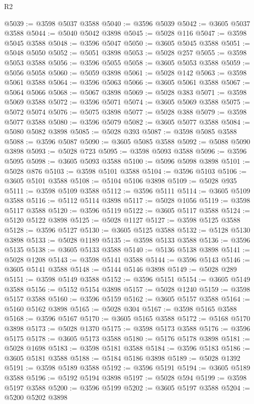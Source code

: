 \begin{lexlean}{R2}
\begin{coremodule}
@5039 := @3598 @5037 @3588
@5040 := @3596 @5039
@5042 := @3605 @5037 @3588
@5044 := @5040 @5042 @3898
@5045 := @5028 @116
@5047 := @3598 @5045 @3588
@5048 := @3596 @5047
@5050 := @3605 @5045 @3588
@5051 := @5048 @5050
@5052 := @5051 @3898
@5053 := @5028 @257
@5055 := @3598 @5053 @3588
@5056 := @3596 @5055
@5058 := @3605 @5053 @3588
@5059 := @5056 @5058
@5060 := @5059 @3898
@5061 := @5028 @142
@5063 := @3598 @5061 @3588
@5064 := @3596 @5063
@5066 := @3605 @5061 @3588
@5067 := @5064 @5066
@5068 := @5067 @3898
@5069 := @5028 @383
@5071 := @3598 @5069 @3588
@5072 := @3596 @5071
@5074 := @3605 @5069 @3588
@5075 := @5072 @5074
@5076 := @5075 @3898
@5077 := @5028 @388
@5079 := @3598 @5077 @3588
@5080 := @3596 @5079
@5082 := @3605 @5077 @3588
@5084 := @5080 @5082 @3898
@5085 := @5028 @393
@5087 := @3598 @5085 @3588
@5088 := @3596 @5087
@5090 := @3605 @5085 @3588
@5092 := @5088 @5090 @3898
@5093 := @5028 @723
@5095 := @3598 @5093 @3588
@5096 := @3596 @5095
@5098 := @3605 @5093 @3588
@5100 := @5096 @5098 @3898
@5101 := @5028 @876
@5103 := @3598 @5101 @3588
@5104 := @3596 @5103
@5106 := @3605 @5101 @3588
@5108 := @5104 @5106 @3898
@5109 := @5028 @935
@5111 := @3598 @5109 @3588
@5112 := @3596 @5111
@5114 := @3605 @5109 @3588
@5116 := @5112 @5114 @3898
@5117 := @5028 @1056
@5119 := @3598 @5117 @3588
@5120 := @3596 @5119
@5122 := @3605 @5117 @3588
@5124 := @5120 @5122 @3898
@5125 := @5028 @1127
@5127 := @3598 @5125 @3588
@5128 := @3596 @5127
@5130 := @3605 @5125 @3588
@5132 := @5128 @5130 @3898
@5133 := @5028 @1189
@5135 := @3598 @5133 @3588
@5136 := @3596 @5135
@5138 := @3605 @5133 @3588
@5140 := @5136 @5138 @3898
@5141 := @5028 @1208
@5143 := @3598 @5141 @3588
@5144 := @3596 @5143
@5146 := @3605 @5141 @3588
@5148 := @5144 @5146 @3898
@5149 := @5028 @289
@5151 := @3598 @5149 @3588
@5152 := @3596 @5151
@5154 := @3605 @5149 @3588
@5156 := @5152 @5154 @3898
@5157 := @5028 @1240
@5159 := @3598 @5157 @3588
@5160 := @3596 @5159
@5162 := @3605 @5157 @3588
@5164 := @5160 @5162 @3898
@5165 := @5028 @304
@5167 := @3598 @5165 @3588
@5168 := @3596 @5167
@5170 := @3605 @5165 @3588
@5172 := @5168 @5170 @3898
@5173 := @5028 @1370
@5175 := @3598 @5173 @3588
@5176 := @3596 @5175
@5178 := @3605 @5173 @3588
@5180 := @5176 @5178 @3898
@5181 := @5028 @1698
@5183 := @3598 @5181 @3588
@5184 := @3596 @5183
@5186 := @3605 @5181 @3588
@5188 := @5184 @5186 @3898
@5189 := @5028 @1392
@5191 := @3598 @5189 @3588
@5192 := @3596 @5191
@5194 := @3605 @5189 @3588
@5196 := @5192 @5194 @3898
@5197 := @5028 @594
@5199 := @3598 @5197 @3588
@5200 := @3596 @5199
@5202 := @3605 @5197 @3588
@5204 := @5200 @5202 @3898

\end{coremodule}
\end{lexlean}
